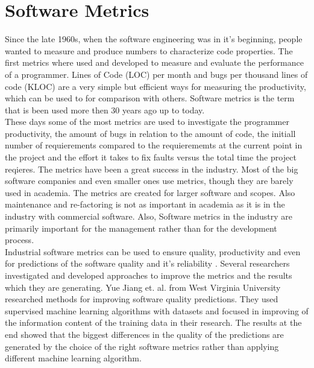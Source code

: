 \section{Software Metrics}
Since the late 1960s, when the software engineering was in it's beginning, people wanted to measure and produce numbers to characterize code properties. 
The first metrics where used and developed to measure and evaluate the performance of a programmer. Lines of Code (LOC) per month and bugs per thousand lines of code (KLOC) are a very simple but efficient ways for measuring the productivity, which can be used to for comparison with others.
Software metrics is the term that is been used more then 30 years ago up to today. \\
These days some of the most metrics are used to investigate the programmer productivity, the amount of bugs in relation to the amount of code, the initiall number of requierements compared to the requierememts at the current point in the project and the effort it takes to fix faults versus the total time the project reqieres. \cite{kaner2004software}
The metrics have been a great success in the industry. Most of the big software companies and even smaller ones use metrics, though they are barely used in academia. 
The metrics are created for larger software and scopes. Also maintenance and re-factoring is not as important in academia as it is in the industry with commercial software. Also, Software metrics in the industry are primarily important for the management rather than for the development process.\\
Industrial software metrics can be used to ensure quality, productivity and even for predictions of the software quality and it's reliability \cite{fenton1999software}.
Several researchers investigated and developed approaches to improve the metrics and the results which they are generating. 
Yue Jiang et. al. from West Virginia University researched methods for improving software quality predictions. They used supervised machine learning algorithms with datasets and focused in improving of the information content of the training data in their research. The results at the end showed that the biggest differences in the quality of the predictions are generated by the choice of the right software metrics rather than applying different machine learning algorithm. 
\cite{jiang2008comparing} 

